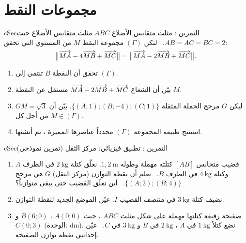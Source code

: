\documentclass[12pt,a4paper]{article}
\newenvironment{BOX}[2]{\begin{otherlanguage}{english}\begin{arbox}{#1}{#2}}{\end{arbox}\end{otherlanguage}}
\newcounter{exo}
\newenvironment{tamrin}[1]{\stepcounter{exo}\begin{BOX}{cSec}{التمرين \theexo: #1}}{\end{BOX}}
\begin{document}
\section{مجموعات النقط}
\begin{tamrin}{مثلث متقايس الأضلاع}
$ABC$ مثلث متقايس الأضلاع حيث $AB=AC=BC=2$. \ لتكن $(\Gamma)$ مجموعة النقط $M$ من المستوي التي تحقق:
\[\big\|\overrightarrow{MA}-4\overrightarrow{MB}+\overrightarrow{MC}\big\|=\big\|\overrightarrow{MA}-2\overrightarrow{MB}+\overrightarrow{MC}\big\|.\]
\begin{enumerate}
\item تحقق أن النقطة $B$ تنتمي إلى $(\Gamma)$.
\item بيّن أن الشعاع $\overrightarrow{MA}-2\overrightarrow{MB}+\overrightarrow{MC}$ مستقل عن النقطة $M$.
\item ليكن $G$ مرجح الجملة المثقلة $\{(A;1);(B;-4);(C;1)\}$. بيّن أن $GM=\sqrt3$ من أجل كل $M\in(\Gamma)$.
\item استنتج طبيعة المجموعة $(\Gamma)$ محدداً عناصرها المميزة ، ثم أنشئها.
\end{enumerate}
\end{tamrin}

\begin{tamrin}{تطبيق فيزيائي: مركز الثقل (تمرين نموذجي)}
\begin{enumerate}
\item قضيب متجانس $[AB]$ كتلته مهملة وطوله $1{,}2\ \text{m}$. نعلّق كتلة $2\ \text{kg}$ في الطرف $A$ وكتلة $4\ \text{kg}$ في الطرف $B$. \ نعلم أن نقطة التوازن (مركز الثقل) $G$ هي مرجح $\{(A;2);(B;4)\}$. \ أين نعلّق القضيب حتى يبقى متوازناً؟
\item نضيف كتلة $3\ \text{kg}$ في منتصف القضيب $I$. عيّن الموضع الجديد لنقطة التوازن.
\item صفيحة رقيقة كتلتها مهملة على شكل مثلث $ABC$ ، حيث $A(0;0)$ ، $B(6;0)$ و $C(0;3)$ (الوحدة: dm). نضع كتلاً $1\ \text{kg}$ في $A$ ، $2\ \text{kg}$ في $B$ و $3\ \text{kg}$ في $C$. \ عيّن إحداثيي نقطة توازن الصفيحة.
\end{enumerate}
\end{tamrin}

\end{document}
